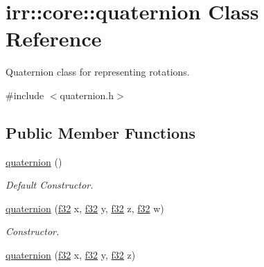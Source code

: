 \hypertarget{classirr_1_1core_1_1quaternion}{}\section{irr\+:\+:core\+:\+:quaternion Class Reference}
\label{classirr_1_1core_1_1quaternion}


Quaternion class for representing rotations.  




{\ttfamily \#include $<$quaternion.\+h$>$}

\subsection*{Public Member Functions}
\begin{DoxyCompactItemize}
\item 
\mbox{\label{classirr_1_1core_1_1quaternion_af19629224bc2ed3a3ecbc335309099c8}} 
\hyperlink{classirr_1_1core_1_1quaternion_af19629224bc2ed3a3ecbc335309099c8}{quaternion} ()
\begin{DoxyCompactList}\small\item\em Default Constructor. \end{DoxyCompactList}\item 
\mbox{\label{classirr_1_1core_1_1quaternion_a7bff9d1ca51483f96094fa5ac9d97342}} 
\hyperlink{classirr_1_1core_1_1quaternion_a7bff9d1ca51483f96094fa5ac9d97342}{quaternion} (\hyperlink{namespaceirr_a0277be98d67dc26ff93b1a6a1d086b07}{f32} x, \hyperlink{namespaceirr_a0277be98d67dc26ff93b1a6a1d086b07}{f32} y, \hyperlink{namespaceirr_a0277be98d67dc26ff93b1a6a1d086b07}{f32} z, \hyperlink{namespaceirr_a0277be98d67dc26ff93b1a6a1d086b07}{f32} w)
\begin{DoxyCompactList}\small\item\em Constructor. \end{DoxyCompactList}\item 
\mbox{\label{classirr_1_1core_1_1quaternion_a299947a6d5c4f3ac2aa64fcffcc11be0}} 
\hyperlink{classirr_1_1core_1_1quaternion_a299947a6d5c4f3ac2aa64fcffcc11be0}{quaternion} (\hyperlink{namespaceirr_a0277be98d67dc26ff93b1a6a1d086b07}{f32} x, \hyperlink{namespaceirr_a0277be98d67dc26ff93b1a6a1d086b07}{f32} y, \hyperlink{namespaceirr_a0277be98d67dc26ff93b1a6a1d086b07}{f32} z)

\end{DoxyCompactItemize}
